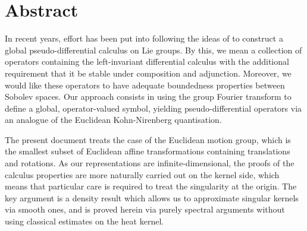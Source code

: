 \chapter*{Abstract}

In recent years,
effort has been put into following the ideas of \citeauthor{RuzhanskyTurunen10}
to construct a global pseudo-differential calculus on Lie groups.
By this, we mean a collection of operators containing the left-invariant differential calculus
with the additional requirement that it be stable under composition and adjunction.
Moreover,
we would like these operators to
have adequate boundedness properties between Sobolev spaces.
Our approach consists in using the group Fourier transform to define a global, operator-valued symbol,
yielding pseudo-differential operators via an analogue of the Euclidean Kohn-Nirenberg quantisation.

The present document treats the case of the Euclidean motion group,
which is the smallest subset of Euclidean affine transformations containing translations and rotations.
As our representations are infinite-dimensional,
the proofs of the calculus properties are more naturally carried out on the kernel side,
which means that particular care is required to treat the singularity at the origin.
The key argument is a density result which allows us to approximate singular kernels via smooth ones,
and is proved herein via purely spectral arguments without using classical estimates on the heat kernel.
